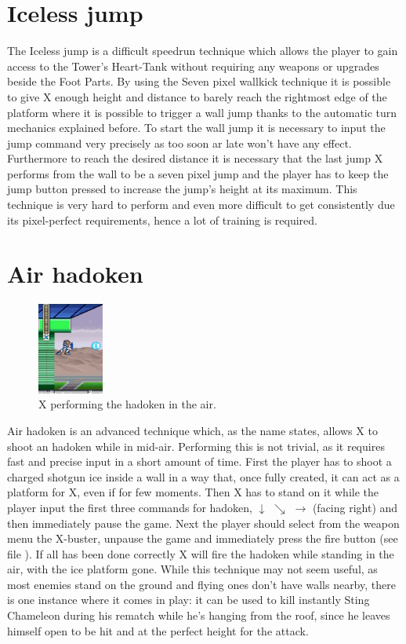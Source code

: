 \section{Iceless jump}\label{misc:iceless}
The Iceless jump is a difficult speedrun technique which allows the player to gain access to the Tower's Heart-Tank without requiring any weapons or upgrades beside the Foot Parts. By using the Seven pixel wallkick technique it is possible to give X enough height and distance to barely reach the rightmost edge of the platform where it is possible to trigger a wall jump thanks to the automatic turn mechanics explained before. To start the wall jump it is necessary to input the jump command very precisely as too soon ar late won't have any effect. Furthermore to reach the desired distance it is necessary that the last jump X performs from the wall to be a seven pixel jump and the player has to keep the jump button pressed to increase the jump's height at its maximum. 
This technique is very hard to perform and even more difficult to get consistently due its pixel-perfect requirements, hence a lot of training is required.


\section{Air hadoken}
\begin{figure}[htp]
	\centering
	\includegraphics[height=3cm]{figures/X1/Miscs/Flying_hadoken.jpg}
	\caption{X performing the hadoken in the air.}
\end{figure}
Air hadoken is an advanced technique which, as the name states, allows X to shoot an hadoken while in mid-air. Performing this is not trivial, as it requires fast and precise input in a short amount of time. First the player has to shoot a charged shotgun ice inside a wall in a way that, once fully created, it can act as a platform for X, even if for few moments. Then X has to stand on it while the player input the first three commands for hadoken, $\downarrow$ $\searrow$ $\rightarrow$ (facing right) and then immediately pause the game. Next the player should select from the weapon menu the X-buster, unpause the game and immediately press the fire button (see file ). If all has been done correctly X will fire the hadoken while standing in the air, with the ice platform gone. While this technique may not seem useful, as most enemies stand on the ground and flying ones don't have walls nearby, there is one instance where it comes in play: it can be used to kill instantly Sting Chameleon during his rematch while he's hanging from the roof, since he leaves himself open to be hit and at the perfect height for the attack.


